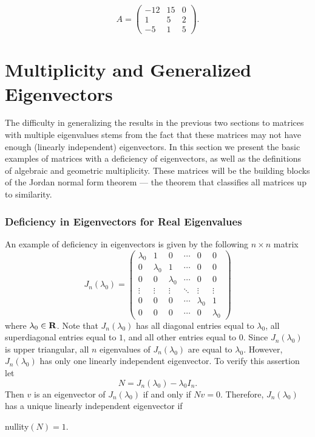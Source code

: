 \documentclass{ximera}
\begin{document}
\begin{exercise} \label{c10.4.7d}
\begin{equation*}
A = \left(\begin{array}{rrr}
   -12 &    15 &     0\\
     1 &     5 &     2\\
    -5 &     1 &     5
\end{array}\right).
\end{equation*}
\end{exercise}



\section{Multiplicity and Generalized Eigenvectors}  \label{S:MGE}

The difficulty in generalizing the results in the previous two sections to
matrices with multiple eigenvalues stems from the fact that these matrices 
may not have enough (linearly independent) eigenvectors.  In this section we 
present the basic examples of matrices with a deficiency of eigenvectors, as
well as the definitions of algebraic and geometric multiplicity.  These 
matrices will be the building blocks of the Jordan normal form theorem --- 
the theorem that classifies all matrices up to similarity.

\subsubsection*{Deficiency in Eigenvectors for Real Eigenvalues}

An example of deficiency in eigenvectors is given by the following 
$n\times n$ matrix
\begin{equation}  \label{E:JnR}
J_n(\lambda_0)=\left(\begin{array}{cccccc} \lambda_0 & 1 & 0 & \cdots & 0 & 0\\
	0 & \lambda_0 & 1 & \cdots & 0 & 0 \\
	0 & 0 & \lambda_0  & \cdots & 0 & 0\\
	\vdots & \vdots & \vdots & \ddots & \vdots & \vdots\\
	0 & 0 & 0 & \cdots & \lambda_0 & 1 \\
	0 & 0 & 0 & \cdots & 0 & \lambda_0 \end{array}\right)
\end{equation}
where $\lambda_0\in\mbox{$\bf{R}$}$.  Note that $J_n(\lambda_0)$ has all diagonal 
entries equal to $\lambda_0$,
all superdiagonal entries equal to $1$, and all other entries equal 
to $0$. Since $J_n(\lambda_0)$ is upper triangular, all $n$ 
eigenvalues of $J_n(\lambda_0)$ are equal to $\lambda_0$.  However,
$J_n(\lambda_0)$ has only one linearly independent eigenvector.  To 
verify this assertion let 
\[
N = J_n(\lambda_0) - \lambda_0I_n.
\]
Then $v$ is an eigenvector of $J_n(\lambda_0)$ if and only if $Nv=0$.
Therefore, $J_n(\lambda_0)$ has a unique linearly independent 
eigenvector  if 
\begin{lemma}
{\rm nullity}$(N)=1$.
\end{lemma}
\end{document}

